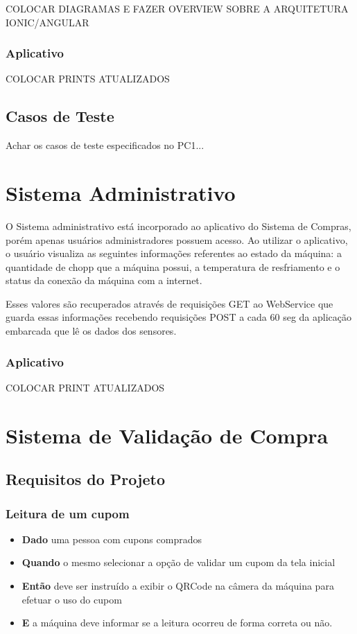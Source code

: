 COLOCAR DIAGRAMAS E FAZER OVERVIEW SOBRE A ARQUITETURA IONIC/ANGULAR

\subsubsection{Aplicativo}

COLOCAR PRINTS ATUALIZADOS

\subsection{Casos de Teste}

Achar os casos de teste especificados no PC1...

\section[Sistema Administrativo]{Sistema Administrativo}

O Sistema administrativo está incorporado ao aplicativo do Sistema de Compras, porém apenas usuários
administradores possuem acesso. Ao utilizar o aplicativo, o usuário visualiza
as seguintes informações referentes ao estado da máquina: a quantidade de chopp que a
máquina possui, a temperatura de resfriamento e o status da conexão da máquina com a internet.

Esses valores são recuperados através de requisições GET ao WebService que guarda essas informações recebendo
requisições POST a cada 60 seg da aplicação embarcada que lê os dados dos sensores. 

\subsubsection{Aplicativo}

COLOCAR PRINT ATUALIZADOS

\section[Sistema de Validação de Compra]{Sistema de Validação de Compra}
\subsection[Requisitos do Projeto]{Requisitos do Projeto}
\subsubsection[Leitura de um cupom]{Leitura de um cupom}
\begin{itemize}
    \item \textbf{Dado} uma pessoa com cupons comprados
    \item \textbf{Quando} o mesmo selecionar a opção de validar um cupom da tela inicial
    \item \textbf{Então} deve ser instruído a exibir o QRCode na câmera da máquina para
    efetuar o uso do cupom
    \item \textbf{E} a máquina deve informar se a leitura ocorreu de forma correta ou não.
\end{itemize}

